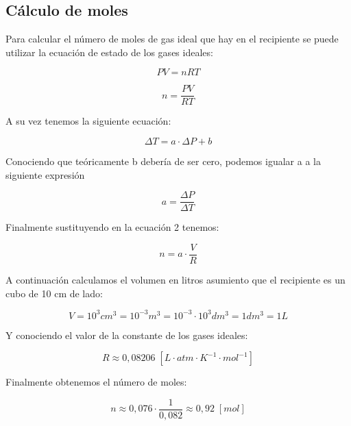 \documentclass{article}
\begin{document}
\subsection{Cálculo de moles}

Para calcular el número de moles de gas ideal que hay en el recipiente se puede utilizar la ecuación de estado de los gases ideales:


\begin{equation}
    PV = nRT
\end{equation}

\begin{equation}
    n = \frac{PV}{RT}
\end{equation}

A su vez tenemos la siguiente ecuación:

\begin{equation}
   \Delta T = a \cdot  \Delta P + b
\end{equation}

Conociendo que teóricamente b debería de ser cero, podemos igualar a a la siguiente expresión

\begin{equation}
   a = \frac{\Delta P }{\Delta T}
\end{equation}

Finalmente sustituyendo en la ecuación 2 tenemos:

\begin{equation}
    n = a \cdot \frac{V}{R}
\end{equation}

A continuación calculamos el volumen en litros asumiento que el recipiente es un cubo de 10 cm de lado:

\begin{equation}
    V = 10^3 cm^3 = 10^{-3} m^3 = 10^{-3} \cdot 10^3 dm^3 = 1 dm^3 = 1 L
\end{equation}

Y conociendo el valor de la constante de los gases ideales:

\begin{equation}
    R \approx 0,08206\; [L \cdot atm \cdot K^{-1} \cdot mol^{-1}]
\end{equation}

Finalmente obtenemos el número de moles:

\begin{equation}
    n \approx 0,076 \cdot \frac{1}{0,082} \approx 0,92 \; [mol]
\end{equation}
\end{document}

